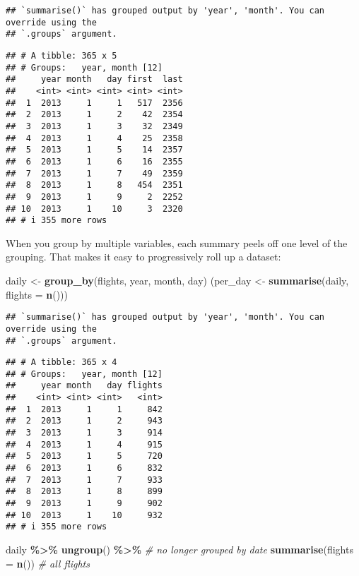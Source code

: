 \documentclass[
]{article}
\newenvironment{Shaded}{\begin{snugshade}}{\end{snugshade}}
\newcommand{\AttributeTok}[1]{\textcolor[rgb]{0.13,0.29,0.53}{#1}}
\newcommand{\CommentTok}[1]{\textcolor[rgb]{0.56,0.35,0.01}{\textit{#1}}}
\newcommand{\FunctionTok}[1]{\textcolor[rgb]{0.13,0.29,0.53}{\textbf{#1}}}
\newcommand{\NormalTok}[1]{#1}
\newcommand{\OtherTok}[1]{\textcolor[rgb]{0.56,0.35,0.01}{#1}}
\newcommand{\SpecialCharTok}[1]{\textcolor[rgb]{0.81,0.36,0.00}{\textbf{#1}}}
\begin{document}
\begin{verbatim}
## `summarise()` has grouped output by 'year', 'month'. You can override using the
## `.groups` argument.
\end{verbatim}

\begin{verbatim}
## # A tibble: 365 x 5
## # Groups:   year, month [12]
##     year month   day first  last
##    <int> <int> <int> <int> <int>
##  1  2013     1     1   517  2356
##  2  2013     1     2    42  2354
##  3  2013     1     3    32  2349
##  4  2013     1     4    25  2358
##  5  2013     1     5    14  2357
##  6  2013     1     6    16  2355
##  7  2013     1     7    49  2359
##  8  2013     1     8   454  2351
##  9  2013     1     9     2  2252
## 10  2013     1    10     3  2320
## # i 355 more rows
\end{verbatim}

When you group by multiple variables, each summary peels off one level
of the grouping. That makes it easy to progressively roll up a dataset:

\begin{Shaded}
\begin{Highlighting}[]
\NormalTok{daily }\OtherTok{\textless{}{-}} \FunctionTok{group\_by}\NormalTok{(flights, year, month, day)}
\NormalTok{(per\_day   }\OtherTok{\textless{}{-}} \FunctionTok{summarise}\NormalTok{(daily, }\AttributeTok{flights =} \FunctionTok{n}\NormalTok{()))}
\end{Highlighting}
\end{Shaded}

\begin{verbatim}
## `summarise()` has grouped output by 'year', 'month'. You can override using the
## `.groups` argument.
\end{verbatim}

\begin{verbatim}
## # A tibble: 365 x 4
## # Groups:   year, month [12]
##     year month   day flights
##    <int> <int> <int>   <int>
##  1  2013     1     1     842
##  2  2013     1     2     943
##  3  2013     1     3     914
##  4  2013     1     4     915
##  5  2013     1     5     720
##  6  2013     1     6     832
##  7  2013     1     7     933
##  8  2013     1     8     899
##  9  2013     1     9     902
## 10  2013     1    10     932
## # i 355 more rows
\end{verbatim}

\begin{Shaded}
\begin{Highlighting}[]
\NormalTok{daily }\SpecialCharTok{\%\textgreater{}\%} 
  \FunctionTok{ungroup}\NormalTok{() }\SpecialCharTok{\%\textgreater{}\%}             \CommentTok{\# no longer grouped by date}
  \FunctionTok{summarise}\NormalTok{(}\AttributeTok{flights =} \FunctionTok{n}\NormalTok{())  }\CommentTok{\# all flights}
\end{Highlighting}
\end{Shaded}
\end{document}
